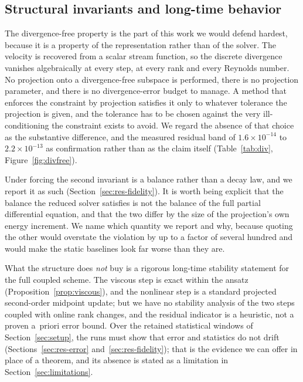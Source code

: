 \subsection{Structural invariants and long-time behavior}
\label{sec:disc-invariants}

The divergence-free property is the part of this work we would defend hardest,
because it is a property of the representation rather than of the solver. The velocity
is recovered from a scalar stream function, so the discrete divergence vanishes
algebraically at every step, at every rank and every Reynolds number. No projection
onto a divergence-free subspace is performed, there is no projection parameter, and
there is no divergence-error budget to manage. A method that enforces the constraint by
projection satisfies it only to whatever tolerance the projection is given, and the
tolerance has to be chosen against the very ill-conditioning the constraint exists to
avoid. We regard the absence of that choice as the substantive difference, and the
measured residual band of $1.6\times 10^{-14}$ to $2.2\times 10^{-13}$ as confirmation
rather than as the claim itself (Table~\ref{tab:div}, Figure~\ref{fig:divfree}).

Under forcing the second invariant is a balance rather than a decay law, and we report
it as such (Section~\ref{sec:res-fidelity}). It is worth being explicit that the balance the reduced solver satisfies is
not the balance of the full partial differential equation, and that the two differ by
the size of the projection's own energy increment. We name which quantity we report and
why, because quoting the other would overstate the violation by up to a factor of
several hundred and would make the static baselines look far worse than they are.

What the structure does \emph{not} buy is a rigorous long-time stability
statement for the full coupled scheme. The viscous step is exact within the
ansatz (Proposition~\ref{prop:viscous}), and the nonlinear step is a standard
projected second-order midpoint update; but we have no stability analysis of
the two steps coupled with online rank changes, and the residual indicator
is a heuristic, not a proven a~priori error bound. Over the retained
statistical windows of Section~\ref{sec:setup}, the runs must show that
error and statistics do not drift (Sections~\ref{sec:res-error}
and~\ref{sec:res-fidelity}); that is the evidence we can offer in place of a
theorem, and its absence is stated as a limitation in
Section~\ref{sec:limitations}.


